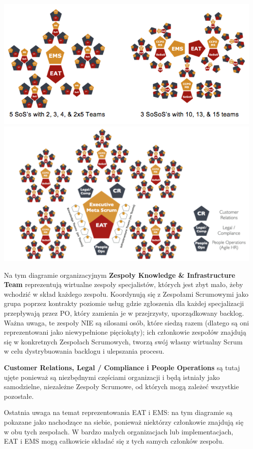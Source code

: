 \documentclass[12pt,a4paper,parskip=full]{scrartcl}
\begin{document}
\includegraphics[width=1.0\linewidth]{VariableSoS-R2.png}
\includegraphics[width=1.0\linewidth]{OrganizationalDiagram.png}

	Na tym diagramie organizacyjnym \textbf{Zespoły Knowledge \& Infrastructure Team} reprezentują wirtualne zespoły specjalistów, których jest zbyt mało, żeby wchodzić w skład każdego zespołu. Koordynują się z Zespołami Scrumowymi jako grupa poprzez kontrakty poziomie usług gdzie zgłoszenia dla każdej specjalizacji przepływają przez PO, który zamienia je w przejrzysty, uporządkowany backlog. Ważna uwaga, te zespoły NIE są silosami osób, które siedzą razem (dlatego są oni reprezentowani jako niewypełnione pięciokąty); ich członkowie zespołów znajdują się w konkretnych Zespołach Scrumowych, tworzą swój własny wirtualny Scrum w celu dystrybuowania backlogu i ulepszania procesu.

\textbf{Customer Relations, Legal / Compliance i People Operations} są tutaj ujęte ponieważ są niezbędnymi częściami organizacji i będą istniały jako samodzielne, niezależne Zespoły Scrumowe, od których mogą zależeć wszystkie pozostałe. 

Ostatnia uwaga na temat reprezentowania EAT i EMS: na tym diagramie są pokazane jako nachodzące na siebie, ponieważ niektórzy członkowie znajdują się w obu tych zespołach. W bardzo małych organizacjach lub implementacjach, EAT i EMS mogą całkowicie składać się z tych samych członków zespołu.
\end{document}
